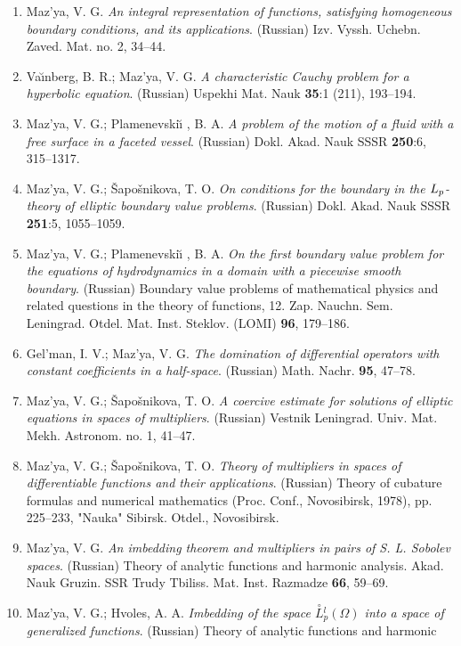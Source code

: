\documentclass{article}
\begin{document}
\begin{enumerate}
{\bf 1980}
\item Maz'ya, V. G. {\it An integral representation of functions,
satisfying homogeneous
boundary conditions, and its applications}. (Russian) Izv. Vyssh.
Uchebn.
Zaved. Mat. no. 2, 34--44.
\item Va{\u\i}nberg, B. R.; Maz'ya, V. G. {\it A characteristic Cauchy
problem for a hyperbolic equation}.
(Russian) Uspekhi Mat. Nauk {\bf 35}:1 (211), 193--194.
\item Maz'ya, V. G.; Plamenevski{\u\i} , B. A. {\it A problem of the
motion
of a fluid with a free surface
in a faceted vessel}. (Russian) Dokl. Akad. Nauk SSSR {\bf 250}:6,
315--1317.
\item Maz'ya, V. G.; \v Sapo\v snikova, T. O. {\it On conditions for
the
boundary in the $L\sb{p}$-theory of
elliptic boundary value problems}. (Russian) Dokl. Akad. Nauk SSSR
{\bf
251}:5, 1055--1059.
\item Maz'ya, V. G.; Plamenevski{\u\i} , B. A. {\it On the first
boundary
value problem for the equations of
hydrodynamics in a domain with a piecewise smooth boundary}. (Russian)
Boundary value problems of mathematical physics and related
questions in the theory of functions, 12. Zap. Nauchn. Sem. Leningrad.
Otdel. Mat. Inst. Steklov. (LOMI) {\bf 96}, 179--186.
\item Gel'man, I. V.; Maz'ya, V. G. {\it The domination of
differential
operators with constant coefficients in a half-space}.
(Russian) Math. Nachr. {\bf 95}, 47--78.
\item Maz'ya, V. G.; \v Sapo\v snikova, T. O. {\it A coercive estimate
for
solutions of elliptic equations
in spaces of multipliers}. (Russian) Vestnik Leningrad. Univ. Mat.
Mekh.
Astronom. no. 1, 41--47.
\item Maz'ya, V. G.; \v Sapo\v snikova, T. O. {\it Theory of
multipliers in
spaces of differentiable functions and
their applications}. (Russian) Theory of cubature formulas and
numerical
mathematics (Proc. Conf., Novosibirsk, 1978), pp.
225--233, "Nauka" Sibirsk. Otdel., Novosibirsk.
\item Maz'ya, V. G. {\it An imbedding theorem and multipliers in pairs
of
S. L. Sobolev spaces}.
(Russian) Theory of analytic functions and harmonic analysis. Akad.
Nauk
Gruzin. SSR Trudy Tbiliss. Mat. Inst. Razmadze {\bf 66},
59--69.
\item Maz'ya, V. G.; Hvoles, A. A. {\it Imbedding of the space
$\stackrel{\circ}{L}\!\!{}_p^l(\Omega )$ into a space of generalized
functions}.  (Russian) Theory of analytic functions and harmonic

\end{enumerate}
\end{document}
